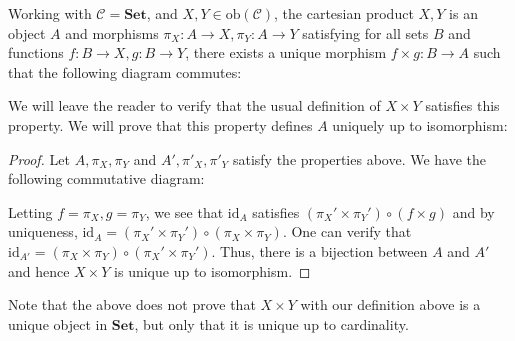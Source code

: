\documentclass[12pt,reqno]{amsart}
\numberwithin{theorem}{section}
\theoremstyle{definition}
\theoremstyle{remark}
\numberwithin{equation}{section}
\newcommand{\cC}{\mathcal{C}}
\theoremstyle{definition}
\newcommand{\ob}{\mathrm{ob}}
\newcommand{\id}{\mathrm{id}}
\begin{document}
\begin{example}
    Working with $\cC=\mathbf{Set}$, and $X,Y \in \ob(\cC)$, the cartesian product $X,Y$ is an object $A$ and morphisms $\pi_X:A\rightarrow X,\pi_Y:A\rightarrow Y$ satisfying for all sets $B$ and functions $f:B\rightarrow X,g:B\rightarrow Y$, there exists a unique morphism $f\times g:B\rightarrow A$ such that the following diagram commutes:
    \begin{center}
    \end{center}
    We will leave the reader to verify that the usual definition of $X\times Y$ satisfies this property. We will prove that this property defines $A$ uniquely up to isomorphism:
    \begin{proof}
        Let $A,\pi_X,\pi_Y$ and $A',\pi'_X,\pi'_Y$ satisfy the properties above. We have the following commutative diagram:
        \begin{center}
        \end{center}
        Letting $f = \pi_X,g=\pi_Y$, we see that $\id_A$ satisfies $(\pi_X'\times \pi_Y')\circ (f\times g)$ and by uniqueness, $\id_A=(\pi_X'\times \pi_Y')\circ (\pi_X\times \pi_Y)$. One can verify that $\id_{A'}=(\pi_X\times \pi_Y)\circ (\pi_X'\times \pi_Y')$. Thus, there is a bijection between $A$ and $A'$ and hence $X\times Y$ is unique up to isomorphism.
    \end{proof}
    Note that the above does not prove that $X\times Y$ with our definition above is a unique object in $\mathbf{Set}$, but only that it is unique up to cardinality. 
\end{example}
\end{document}
